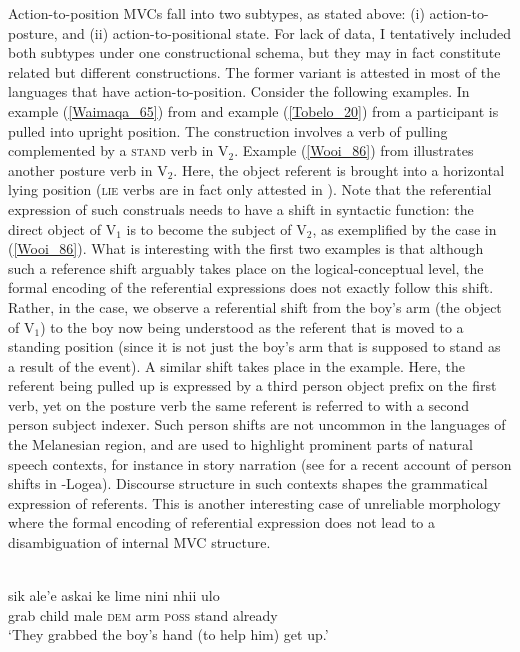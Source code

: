 Action-to-position MVCs fall into two subtypes, as stated above: (i) action-to-posture, and (ii) action-to-positional state. For lack of data, I tentatively included both subtypes under one constructional schema, but they may in fact constitute related but different constructions. The former variant is attested in most of the languages that have action-to-position. Consider the following examples. In example (\ref{Waimaqa_65}) from  and example (\ref{Tobelo_20}) from  a participant is pulled into upright position. The construction involves a verb of pulling complemented by a \textsc{stand} verb in V$_2$. Example (\ref{Wooi_86}) from  illustrates another posture verb in V$_2$. Here, the object referent is brought into a horizontal lying position (\textsc{lie} verbs are in fact only attested in ). Note that the referential expression of such construals needs to have a shift in syntactic function: the direct object of V$_1$ is to become the subject of V$_2$, as exemplified by the  case in (\ref{Wooi_86}). What is interesting with the first two examples is that although such a reference shift arguably takes place on the logical-conceptual level, the formal encoding of the referential expressions does not exactly follow this shift. Rather, in the  case, we observe a referential shift from the boy's arm (the object of V$_1$) to the boy now being understood as the referent that is moved to a standing position (since it is not just the boy's arm that is supposed to stand as a result of the event). A similar shift takes place in the  example. Here, the referent being pulled up is expressed by a third person object prefix on the first verb, yet on the posture verb the same referent is referred to with a second person subject indexer. Such person shifts are not uncommon in the languages of the Melanesian region, and are used to highlight prominent parts of natural speech contexts, for instance in story narration (see \citealt{margetts2015person} for a recent account of person shifts in -Logea). Discourse structure in such contexts shapes the grammatical expression of referents. This is another interesting case of unreliable morphology where the formal encoding of referential expression does not lead to a disambiguation of internal MVC structure.

\ea \label{Waimaqa_65}
\\
\gll sik ale'e askai ke lime nini nhii ulo \\
grab child male \textsc{dem} arm \textsc{poss} stand already \\
\glft `They grabbed the boy's hand (to help him) get
up.'\\ 
\z

